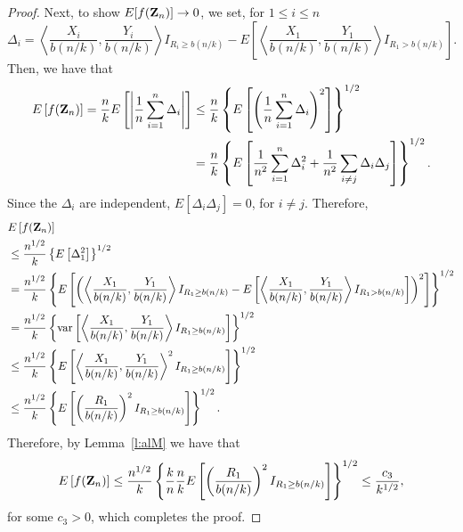 \documentclass[10pt,a4paper]{amsart}
\newcommand\bZ{{\bf Z}}
\newcommand\lbr{\left \{}
\newcommand\lb{\left [}
\newcommand\lip{\left \langle}
\newcommand\lmo{\left |}
\newcommand\lp{\left (}
\newcommand\rbr{\right \}}
\newcommand\rb{\right ]}
\newcommand\rip{\right \rangle}
\newcommand\rmo{\right |}
\newcommand\rp{\right )}
\newcommand\var{\hbox{\rm var}}
\begin{document}
\begin{proof}
Next, to show $E[f(\bZ_n)] \to 0$, we set, for $1 \le i \le n$
\[
\Delta_i =  \lip \frac{X_i}{b(n/k)}, \frac{Y_i}{b(n/k)} \rip I_{R_i \ge b(n/k) }- E\lb \lip \frac{X_1}{b(n/k)}, \frac{Y_1}{b(n/k)} \rip I_{R_1 >b(n/k)}\rb.
\]
Then, we have that
\begin{align*}
E \lb f(\bZ_n) \rb = \frac{n}{k} E \lb \lmo \frac{1}{n} \sum_{i=1}^n \Delta_i \rmo \rb &\le \frac{n}{k} \lbr E \lb \lp \frac{1}{n} \sum_{i=1}^n \Delta_i \rp^2 \rb \rbr^{1/2}\\
&= \frac{n}{k} \lbr E \lb   \frac{1}{n^2} \sum_{i=1}^n \Delta_i^2 + \frac{1}{n^2} \sum_{i \neq j} \Delta_i\Delta_j \rb \rbr^{1/2}.
\end{align*}
Since the $\Delta_i$ are independent, $E[\Delta_i\Delta_j]=0$, for $i \neq j$. Therefore,
\begin{align*}
&E \lb f(\bZ_n) \rb \\
&\le \frac{n^{1/2}}{k} \lbr E \lb    \Delta_1^2  \rb \rbr^{1/2} \\
&= \frac{n^{1/2}}{k} \lbr  E  \lb \lp \lip \frac{X_1}{b(n/k)}, \frac{Y_1}{b(n/k)} \rip I_{R_1 \ge b(n/k) } - E\lb \lip \frac{X_1}{b(n/k)}, \frac{Y_1}{b(n/k)} \rip I_{R_1 >b(n/k)}\rb  \rp^2\rb \rbr^{1/2}\\
& = \frac{n^{1/2}}{k} \lbr  \var \lb  \lip \frac{X_1}{b(n/k)}, \frac{Y_1}{b(n/k)} \rip I_{R_1 \ge b(n/k) } \rb \rbr^{1/2} \\
& \le \frac{n^{1/2}}{k} \lbr  E  \lb \lip \frac{X_1}{b(n/k)}, \frac{Y_1}{b(n/k)} \rip^2 I_{R_1 \ge b(n/k) } \rb \rbr^{1/2}\\
& \le  \frac{n^{1/2}}{k}  \lbr E \lb  \lp \frac{R_1}{b(n/k)} \rp^2  I_{R_1 \ge b(n/k) }  \rb \rbr^{1/2}.
\end{align*}
Therefore, by Lemma~\ref{l:alM} we have that
\[
E \lb f(\bZ_n) \rb \le \frac{n^{1/2}}{k}  \lbr  \frac{k}{n} \frac{n}{k} E \lb  \lp \frac{R_1}{b(n/k)} \rp^2  I_{R_1 \ge b(n/k) }  \rb \rbr^{1/2} \le \frac{c_3}{k^{1/2}},
\]
for some $c_3>0$, which completes the proof.
\end{proof}
\end{document}
